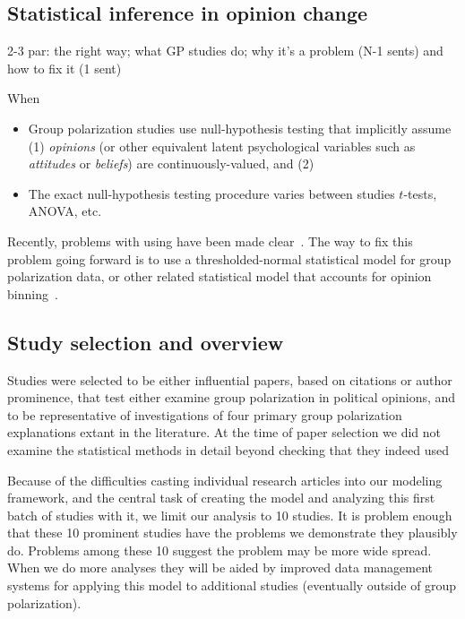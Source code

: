 \documentclass[11pt, letterpaper]{article}
\begin{document}


\subsection{Statistical inference in opinion change}

2-3 par: the right way; what GP studies do; why it's a problem (N-1 sents) and how
to fix it (1 sent)

When 

\begin{itemize}
  \item 
    Group polarization studies use null-hypothesis testing that implicitly
    assume (1) \emph{opinions} (or other equivalent latent psychological variables
    such as \emph{attitudes} or \emph{beliefs}) are continuously-valued, and
    (2) 
  \item
    The exact null-hypothesis testing procedure varies between studies $t$-tests, ANOVA, etc. 
\end{itemize}

Recently, problems with using have been made clear~\cite{Liddell2018}.
The way to fix this problem going forward is to use a thresholded-normal 
statistical model for group polarization data, or other related statistical 
model that accounts for opinion binning~\cite[Ch. 23]{Liddell2018,KruschkeDBDA}.

\subsection{Study selection and overview}

Studies were selected to be either influential papers, based on citations or
author prominence, that test either examine
group polarization in political opinions, and to be representative of investigations
of four primary group polarization explanations extant in the literature.
At the time of paper selection we did not examine the statistical methods in detail beyond
checking that they indeed used 

Because of the difficulties casting individual research articles into our modeling
framework, and the central task of creating the model and analyzing this first
batch of studies with it, we limit our analysis to 10 studies. It is problem
enough that these 10 prominent studies have the problems we demonstrate they
plausibly do. Problems among these 10 suggest the problem may be more wide spread. 
When we do more analyses
they will be aided by improved data management systems for applying this model to 
additional studies (eventually outside of group polarization).
\end{document}
